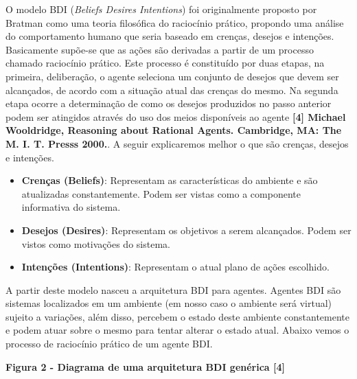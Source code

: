 O modelo BDI (\textit{Beliefs Desires Intentions}) foi originalmente proposto por Bratman como uma teoria filosófica do raciocínio prático, propondo uma análise do comportamento humano que seria baseado em crenças, desejos e intenções.
Basicamente supõe-se que as ações são derivadas a partir de um processo chamado raciocínio prático. Este processo é constituído por duas etapas, na primeira, deliberação, o agente seleciona um conjunto de desejos que devem ser alcançados, de acordo com a situação atual das crenças do mesmo. Na segunda etapa ocorre a determinação de como os desejos produzidos no passo anterior podem ser atingidos através do uso dos meios disponíveis ao agente \textbf{[4] Michael Wooldridge, Reasoning about Rational Agents. Cambridge, MA: The M. I. T. Presss 2000.}.
A seguir explicaremos melhor o que são crenças, desejos e intenções.
\begin{itemize}
\item \textbf{Crenças (Beliefs)}: Representam as características do ambiente e são atualizadas constantemente. Podem ser vistas como a componente informativa do sistema.
\item \textbf{Desejos (Desires)}: Representam os objetivos a serem alcançados. Podem ser vistos como motivações do sistema.
\item \textbf{Intenções (Intentions)}: Representam o atual plano de ações escolhido. 
\end{itemize}

A partir deste modelo nasceu a arquitetura BDI para agentes. Agentes BDI são sistemas localizados em um ambiente (em nosso caso o ambiente será virtual) sujeito a variações, além disso, percebem o estado deste ambiente constantemente e podem atuar sobre o mesmo para tentar alterar o estado atual.
Abaixo vemos o processo de raciocínio prático de um agente BDI.
 
\textbf{Figura 2 - Diagrama de uma arquitetura BDI genérica [4]}

